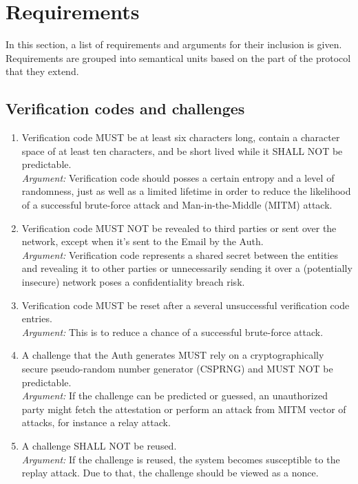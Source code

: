 \section{Requirements}
In this section, a list of requirements and arguments for their inclusion is given. Requirements are grouped into 
semantical units based on the part of the protocol that they extend.

    \subsection{Verification codes and challenges}
        \begin{enumerate}
                \item Verification code MUST be at least six characters long, contain a character space of at 
                      least ten characters, and be short lived while it SHALL NOT be predictable.\\    
                \textit{Argument:} Verification code should posses a certain entropy and a level of randomness, 
                                   just as well as a limited lifetime in order to reduce  the likelihood of a 
                                   successful brute-force attack and Man-in-the-Middle (MITM) attack.

                \item Verification code MUST NOT be revealed to third parties or sent over the network, 
                      except when it's sent to the Email by the Auth.\\        
                \textit{Argument:} Verification code represents a shared secret between the entities and revealing 
                                   it to other parties or unnecessarily sending it over a (potentially insecure) 
                                   network poses a confidentiality breach risk.

                \item Verification code MUST be reset after a several unsuccessful verification code entries.\\        
                \textit{Argument:} This is to reduce a chance of a successful brute-force attack.

                \item A challenge that the Auth generates MUST rely on a cryptographically secure pseudo-random number 
                      generator (CSPRNG) and MUST NOT be predictable.\\
                \textit{Argument:} If the challenge can be predicted or guessed, an unauthorized party might fetch the
                                   attestation or perform an attack from MITM vector of attacks, for instance a relay 
                                   attack.

                \item A challenge SHALL NOT be reused.\\
                \textit{Argument:} If the challenge is reused, the system becomes susceptible to the replay attack. 
                                   Due to that, the challenge should be viewed as a nonce.
        \end{enumerate}

